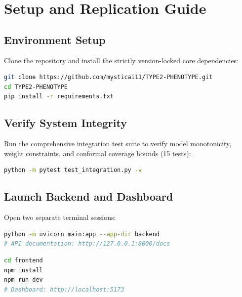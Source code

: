 \documentclass[12pt,a4paper,oneside]{report}
\begin{document}
\appendix
\chapter{Setup and Replication Guide}

\section{Environment Setup}

Clone the repository and install the strictly version-locked core dependencies:
\begin{lstlisting}[language=bash]
git clone https://github.com/mysticai11/TYPE2-PHENOTYPE.git
cd TYPE2-PHENOTYPE
pip install -r requirements.txt
\end{lstlisting}

\section{Verify System Integrity}

Run the comprehensive integration test suite to verify model monotonicity, weight constraints, and conformal coverage bounds (15 tests):
\begin{lstlisting}[language=bash]
python -m pytest test_integration.py -v
\end{lstlisting}

\section{Launch Backend and Dashboard}

Open two separate terminal sessions:

\begin{lstlisting}[language=bash,caption={Terminal 1 - FastAPI Backend}]
python -m uvicorn main:app --app-dir backend
# API documentation: http://127.0.0.1:8000/docs
\end{lstlisting}

\begin{lstlisting}[language=bash,caption={Terminal 2 - React Dashboard}]
cd frontend
npm install
npm run dev
# Dashboard: http://localhost:5173
\end{lstlisting}
\end{document}

